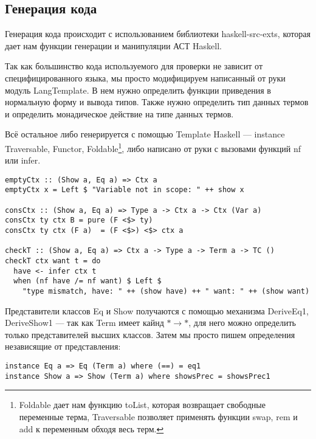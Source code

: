 \subsection{Генерация кода}
Генерация кода происходит с использованием библиотеки haskell-src-exts\cite{src_exts}, которая дает нам функции генерации и манипуляции АСТ Haskell.

Так как большинство кода используемого для проверки не зависит от специфицированного языка, мы просто модифицируем написанный от руки модуль LangTemplate. В нем нужно определить функции приведения в нормальную форму и вывода типов. Также нужно определить тип данных термов и определить монадическое действие на типе данных термов.

Всё остальное либо генерируется с помощью Template Haskell\cite{TH} --- instance Traversable\cite{deriveFun}, Functor, Foldable\footnote{Foldable дает нам функцию toList, которая возвращает свободные переменные терма, Traversable позволяет применять функции swap, rem и add  к переменным обходя весь терм.}, либо написано от руки с вызовами функций nf или infer.

\begin{lstlisting}[caption={Проверка типов и контексты},captionpos=b, frame=single]
emptyCtx :: (Show a, Eq a) => Ctx a
emptyCtx x = Left $ "Variable not in scope: " ++ show x

consCtx :: (Show a, Eq a) => Type a -> Ctx a -> Ctx (Var a)
consCtx ty ctx B = pure (F <$> ty)
consCtx ty ctx (F a)  = (F <$>) <$> ctx a

checkT :: (Show a, Eq a) => Ctx a -> Type a -> Term a -> TC ()
checkT ctx want t = do
  have <- infer ctx t
  when (nf have /= nf want) $ Left $
    "type mismatch, have: " ++ (show have) ++ " want: " ++ (show want)
\end{lstlisting}

Представители классов Eq и Show получаются с помощью механизма DeriveEq1, DeriveShow1\cite{deriveCompat} --- так как Term имеет кайнд $* \rightarrow *$, для него можно определить только представителей высших классов\cite{prel_extras}. Затем мы просто пишем определения независящие от представления:

\begin{lstlisting}[frame=single, float,floatplacement=H]
instance Eq a => Eq (Term a) where (==) = eq1
instance Show a => Show (Term a) where showsPrec = showsPrec1
\end{lstlisting}

